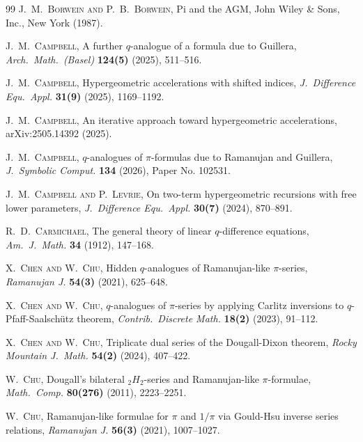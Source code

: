 \documentclass[12pt]{article}
\begin{document}
\begin{thebibliography}{99}
 \textsc{J.\ M.\ Borwein and P.\ B.\ Borwein}, 
 Pi and the {AGM}, 
 John Wiley \& Sons, Inc., New York (1987). 

 \textsc{J.\ M.\ Campbell}, 
 A further {$q$}-analogue of a formula due to {G}uillera, 
 \emph{Arch.\ Math.\ (Basel)} {\bf 124(5)} (2025), 511--516. 

 \textsc{J.\ M.\ Campbell}, 
 Hypergeometric accelerations with shifted indices, 
 \emph{J.\ Difference Equ.\ Appl.} {\bf 31(9)} (2025), 1169--1192. 

 \textsc{J.\ M.\ Campbell}, 
 An iterative approach toward hypergeometric accelerations, 
 arXiv:2505.14392 (2025). 
 
 \textsc{J.\ M.\ Campbell}, 
 {$q$}-analogues of {\it {$\pi $}}-formulas due to {R}amanujan and {G}uillera, 
 \emph{J.\ Symbolic Comput.} {\bf 134} (2026), Paper No. 102531. 

 \textsc{J.\ M.\ Campbell and P.\ Levrie}, 
 On two-term hypergeometric recursions with free lower parameters, 
 \emph{J.\ Difference Equ.\ Appl.} {\bf 30(7)} (2024), 870--891. 

 \textsc{R.\ D.\ Carmichael}, 
 The general theory of linear {{\(q\)}}-difference equations, 
 \emph{Am.\ J.\ Math.} {\bf 34} (1912), 147--168. 
 
 \textsc{X.\ Chen and W.\ Chu}, 
 Hidden {$q$}-analogues of {R}amanujan-like {$\pi$}-series, 
 \emph{Ramanujan J.} {\bf 54(3)} (2021), 625--648. 

 \textsc{X.\ Chen and W.\ Chu}, 
 {$q$}-analogues of {$\pi$}-series by applying {C}arlitz inversions to {$q$}-{P}faff-{S}aalsch\"utz theorem, 
 \emph{Contrib.\ Discrete Math.} {\bf 18(2)} (2023), 91--112. 

 \textsc{X.\ Chen and W.\ Chu}, 
 Triplicate dual series of the {D}ougall-{D}ixon theorem, 
 \emph{Rocky Mountain J.\ Math.} {\bf 54(2)} (2024), 407--422. 

 \textsc{W.\ Chu}, 
 Dougall's bilateral {${}_2H_2$}-series and {R}amanujan-like {$\pi$}-formulae, 
 \emph{Math.\ Comp.} {\bf 80(276)} (2011), 2223--2251. 

 \textsc{W.\ Chu}, 
 Ramanujan-like formulae for {$\pi$} and {$1/\pi$} via {G}ould-{H}su inverse series relations, 
 \emph{Ramanujan J.} {\bf 56(3)} (2021), 1007--1027. 


\end{thebibliography}
\end{document}
